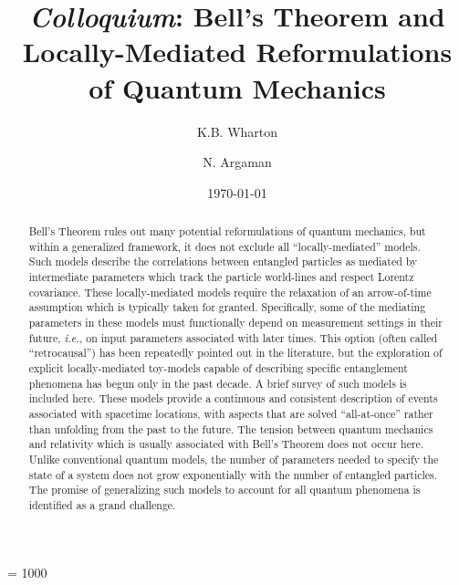 \documentclass[rmp, aps, preprint, longbibliography]{revtex4-1}
\begin{document}
\count\footins = 1000

\title{{\it Colloquium}: Bell's Theorem and Locally-Mediated Reformulations of Quantum Mechanics}
\author{K.B. Wharton}
\author{N. Argaman}
\date{\today}       %

\begin{abstract}

Bell's Theorem rules out many potential reformulations of quantum mechanics, but within a generalized framework, it does not exclude all ``locally-mediated'' models.  Such models describe the correlations between entangled particles as mediated by intermediate parameters which track the particle world-lines and respect Lorentz covariance.  These locally-mediated models require the relaxation of an arrow-of-time assumption which is typically taken for granted.  Specifically, some of the mediating parameters in these models must functionally depend on measurement settings in their future, \emph{i.e.}, on input parameters associated with later times.  This option (often called ``retrocausal'') has been repeatedly pointed out in the literature, but the exploration of explicit locally-mediated toy-models capable of describing specific entanglement phenomena has begun only in the past decade.  A brief survey of such models is included here.  These models provide a continuous and consistent description of events associated with spacetime locations, with aspects that are solved ``all-at-once'' rather than unfolding from the past to the future.  The tension between quantum mechanics and relativity which is usually associated with Bell's Theorem does not occur here.  Unlike conventional quantum models, the number of parameters needed to specify the state of a system does not grow exponentially with the number of entangled particles.  The promise of generalizing such models to account for all quantum phenomena is identified as a grand challenge.

\end{abstract}


\maketitle
\end{document}
